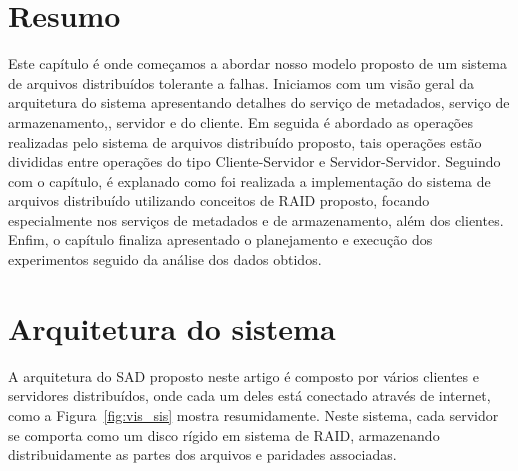 \section{Resumo}
Este capítulo é onde começamos a abordar nosso modelo proposto de um sistema de arquivos distribuídos tolerante a falhas. Iniciamos com um visão geral da arquitetura do sistema apresentando detalhes do serviço de metadados, serviço de armazenamento,, servidor e do cliente. Em seguida é abordado as operações realizadas pelo sistema de arquivos distribuído proposto, tais operações estão divididas entre operações do tipo Cliente-Servidor e Servidor-Servidor. Seguindo com o capítulo, é explanado como foi realizada a implementação do sistema de arquivos distribuído utilizando conceitos de RAID proposto, focando especialmente nos serviços de metadados e de armazenamento, além dos clientes. Enfim, o capítulo finaliza apresentado o planejamento e execução dos experimentos seguido da análise dos dados obtidos.


	\section{Arquitetura do sistema}
	
	A arquitetura do SAD proposto neste artigo é composto por vários clientes e servidores distribuídos, onde cada um deles está conectado através de internet, como a Figura~\ref{fig:vis_sis} mostra resumidamente. Neste sistema, cada servidor se comporta como um disco rígido em sistema de RAID, armazenando distribuidamente as partes dos arquivos e paridades associadas.
	
	

	
	
